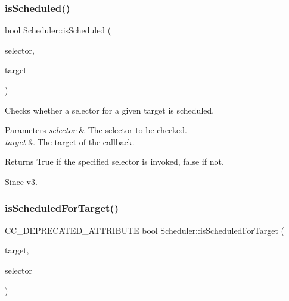 \subsubsection{\texorpdfstring{is\+Scheduled()}{isScheduled()}\hspace{0.1cm}{\footnotesize\ttfamily [4/4]}}
{\footnotesize\ttfamily bool Scheduler\+::is\+Scheduled (\begin{DoxyParamCaption}\item[{S\+E\+L\+\_\+\+S\+C\+H\+E\+D\+U\+LE}]{selector,  }\item[{\hyperlink{classRef}{Ref} $\ast$}]{target }\end{DoxyParamCaption})}

Checks whether a selector for a given target is scheduled. 
\begin{DoxyParams}{Parameters}
{\em selector} & The selector to be checked. \\
\hline
{\em target} & The target of the callback. \\
\hline
\end{DoxyParams}
\begin{DoxyReturn}{Returns}
True if the specified selector is invoked, false if not. 
\end{DoxyReturn}
\begin{DoxySince}{Since}
v3. 
\end{DoxySince}
\mbox{\label{classScheduler_a9cdd2ece7f43eaca5662d12ae0b95a87}} 
\subsubsection{\texorpdfstring{is\+Scheduled\+For\+Target()}{isScheduledForTarget()}\hspace{0.1cm}{\footnotesize\ttfamily [1/2]}}
{\footnotesize\ttfamily C\+C\+\_\+\+D\+E\+P\+R\+E\+C\+A\+T\+E\+D\+\_\+\+A\+T\+T\+R\+I\+B\+U\+TE bool Scheduler\+::is\+Scheduled\+For\+Target (\begin{DoxyParamCaption}\item[{\hyperlink{classRef}{Ref} $\ast$}]{target,  }\item[{S\+E\+L\+\_\+\+S\+C\+H\+E\+D\+U\+LE}]{selector }\end{DoxyParamCaption})\hspace{0.3cm}{\ttfamily [inline]}}

